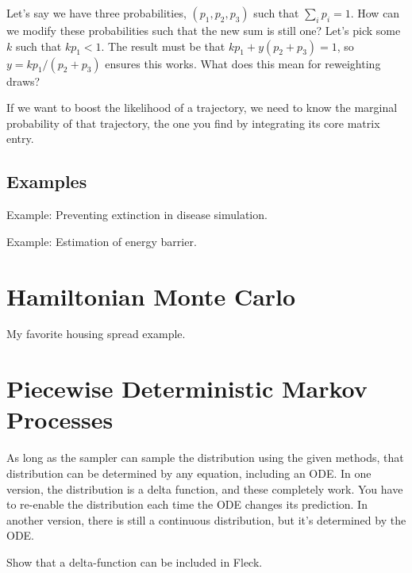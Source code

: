 \documentclass{article}
\begin{document}
Let's say we have three probabilities, $(p_1, p_2, p_3)$ such that $\sum_i p_i=1$. How can we modify these probabilities such that the new sum is still one? Let's pick some $k$ such that $kp_1<1$. The result must be that $kp_1 + y(p_2+p_3)=1$, so $y=kp_1/(p_2+p_3)$ ensures this works. What does this mean for reweighting draws?

If we want to boost the likelihood of a trajectory, we need to know the marginal probability of that trajectory, the one you find by integrating its core matrix entry.


\subsection{Examples}
Example: Preventing extinction in disease simulation.

Example: Estimation of energy barrier.


\section{Hamiltonian Monte Carlo}

My favorite housing spread example.


\section{Piecewise Deterministic Markov Processes}

As long as the sampler can sample the distribution using the given methods, that distribution can be determined by any equation, including an ODE. In one version, the distribution is a delta function, and these completely work. You have to re-enable the distribution each time the ODE changes its prediction. In another version, there is still a continuous distribution, but it's determined by the ODE.

Show that a delta-function can be included in Fleck.
\end{document}

